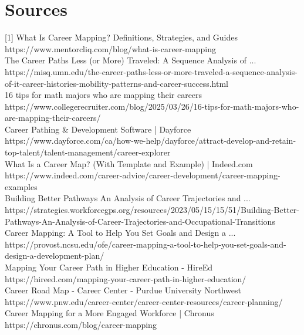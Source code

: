 \documentclass{article}
\begin{document}
\section{Sources}
[1] What Is Career Mapping? Definitions, Strategies, and Guides https://www.mentorcliq.com/blog/what-is-career-mapping\\
[2] The Career Paths Less (or More) Traveled: A Sequence Analysis of ... https://misq.umn.edu/the-career-paths-less-or-more-traveled-a-sequence-analysis-of-it-career-histories-mobility-patterns-and-career-success.html\\
[3] 16 tips for math majors who are mapping their careers https://www.collegerecruiter.com/blog/2025/03/26/16-tips-for-math-majors-who-are-mapping-their-careers/\\
[4] Career Pathing \& Development Software | Dayforce https://www.dayforce.com/ca/how-we-help/dayforce/attract-develop-and-retain-top-talent/talent-management/career-explorer\\
[5] What Is a Career Map? (With Template and Example) | Indeed.com https://www.indeed.com/career-advice/career-development/career-mapping-examples\\
[6] Building Better Pathways An Analysis of Career Trajectories and ... https://strategies.workforcegps.org/resources/2023/05/15/15/51/Building-Better-Pathways-An-Analysis-of-Career-Trajectories-and-Occupational-Transitions\\
[7] Career Mapping: A Tool to Help You Set Goals and Design a ... https://provost.ncsu.edu/ofe/career-mapping-a-tool-to-help-you-set-goals-and-design-a-development-plan/\\
[8] Mapping Your Career Path in Higher Education - HireEd https://hireed.com/mapping-your-career-path-in-higher-education/\\
[9] Career Road Map - Career Center - Purdue University Northwest https://www.pnw.edu/career-center/career-center-resources/career-planning/\\
[10] Career Mapping for a More Engaged Workforce | Chronus https://chronus.com/blog/career-mapping\\
\end{document}
